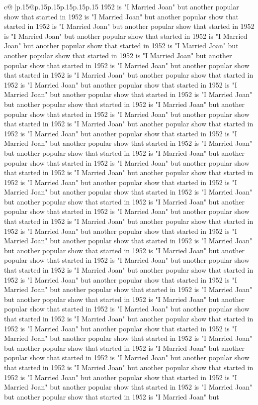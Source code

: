 \documentclass{article}
\begin{document}
{\begin{supertabular}{c@{$\;$}|p{.15\linewidth}@{}p{.15\linewidth}p{.15\linewidth}p{.15\linewidth}p{.15\linewidth}p{.15\linewidth}}
{{{1952 is "I Married Joan" but another popular show that started in 1952 is "I Married Joan" but another popular show that started in 1952 is "I Married Joan" but another popular show that started in 1952 is "I Married Joan" but another popular show that started in 1952 is "I Married Joan" but another popular show that started in 1952 is "I Married Joan" but another popular show that started in 1952 is "I Married Joan" but another popular show that started in 1952 is "I Married Joan" but another popular show that started in 1952 is "I Married Joan" but another popular show that started in 1952 is "I Married Joan" but another popular show that started in 1952 is "I Married Joan" but another popular show that started in 1952 is "I Married Joan" but another popular show that started in 1952 is "I Married Joan" but another popular show that started in 1952 is "I Married Joan" but another popular show that started in 1952 is "I Married Joan" but another popular show that started in 1952 is "I Married Joan" but another popular show that started in 1952 is "I Married Joan" but another popular show that started in 1952 is "I Married Joan" but another popular show that started in 1952 is "I Married Joan" but another popular show that started in 1952 is "I Married Joan" but another popular show that started in 1952 is "I Married Joan" but another popular show that started in 1952 is "I Married Joan" but another popular show that started in 1952 is "I Married Joan" but another popular show that started in 1952 is "I Married Joan" but another popular show that started in 1952 is "I Married Joan" but another popular show that started in 1952 is "I Married Joan" but another popular show that started in 1952 is "I Married Joan" but another popular show that started in 1952 is "I Married Joan" but another popular show that started in 1952 is "I Married Joan" but another popular show that started in 1952 is "I Married Joan" but another popular show that started in 1952 is "I Married Joan" but another popular show that started in 1952 is "I Married Joan" but another popular show that started in 1952 is "I Married Joan" but another popular show that started in 1952 is "I Married Joan" but another popular show that started in 1952 is "I Married Joan" but another popular show that started in 1952 is "I Married Joan" but another popular show that started in 1952 is "I Married Joan" but another popular show that started in 1952 is "I Married Joan" but another popular show that started in 1952 is "I Married Joan" but another popular show that started in 1952 is "I Married Joan" but another popular show that started in 1952 is "I Married Joan" but another popular show that started in 1952 is "I Married Joan" but another popular show that started in 1952 is "I Married Joan" but another popular show that started in 1952 is "I Married Joan" but another popular show that started in 1952 is "I Married Joan" but another popular show that started in 1952 is "I Married Joan" but another popular show that started in 1952 is "I Married Joan" but another popular show that started in 1952 is "I Married Joan" but another popular show that started in 1952 is "I Married Joan" but }}}
\end{supertabular}}
\end{document}
